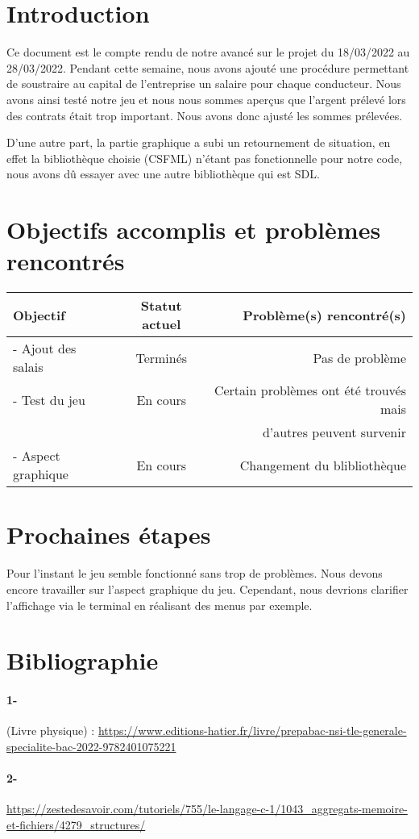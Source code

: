 \documentclass[a4paper, 12pt]{article}
\begin{document}
\newpage



\section*{Introduction}
      Ce document est le compte rendu de notre avancé sur le projet du 18/03/2022 au 28/03/2022. Pendant cette semaine, nous avons ajouté une procédure permettant de soustraire au capital de l'entreprise un salaire pour chaque conducteur. Nous avons ainsi testé notre jeu et nous nous sommes aperçus que l'argent prélevé lors des contrats était trop important. Nous avons donc ajusté les sommes prélevées.

      D'une autre part, la partie graphique a subi un retournement de situation, en effet la bibliothèque choisie (CSFML) n'étant pas fonctionnelle pour notre code, nous avons dû essayer avec une autre bibliothèque qui est SDL. 

\section{Objectifs accomplis et problèmes rencontrés}
     \begin{tabular}{|l|c|r|}
  \hline
  Objectif & Statut actuel & Problème(s) rencontré(s) \\
  \hline
   - Ajout des salais & Terminés & Pas de problème \\
   - Test du jeu & En cours & Certain problèmes ont été trouvés mais \\
    &  & d'autres peuvent survenir \\
     - Aspect graphique & En cours & Changement du blibliothèque \\
  
  

  \hline
\end{tabular}
\section{Prochaines étapes}
    Pour l'instant le jeu semble fonctionné sans trop de problèmes. Nous devons encore travailler sur l'aspect graphique du jeu. Cependant, nous devrions clarifier l'affichage via le terminal en réalisant des menus par exemple.  
    

\appendix  %
\section{Bibliographie}
\paragraph{1- }
(Livre physique) : \url{https://www.editions-hatier.fr/livre/prepabac-nsi-tle-generale-specialite-bac-2022-9782401075221}
\paragraph{2- }
\url{https://zestedesavoir.com/tutoriels/755/le-langage-c-1/1043_aggregats-memoire-et-fichiers/4279_structures/}
\end{document}
